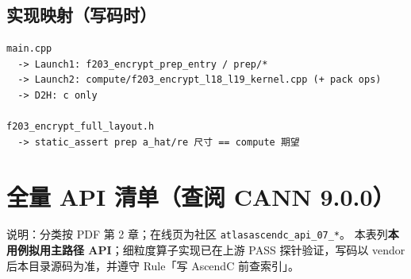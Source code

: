 \documentclass[UTF8,a4paper,11pt]{ctexart}
\begin{document}
\subsection{实现映射（写码时）}

\begin{verbatim}
main.cpp
  -> Launch1: f203_encrypt_prep_entry / prep/*
  -> Launch2: compute/f203_encrypt_l18_l19_kernel.cpp (+ pack ops)
  -> D2H: c only

f203_encrypt_full_layout.h
  -> static_assert prep a_hat/re 尺寸 == compute 期望
\end{verbatim}

\section{全量 API 清单（查阅 CANN 9.0.0）}
\label{sec:api-table}

说明：分类按 PDF 第 2 章；在线页为社区 \texttt{atlasascendc\_api\_07\_*}。
本表列\textbf{本用例拟用主路径 API}；细粒度算子实现已在上游 PASS 探针验证，写码以 vendor 后本目录源码为准，并遵守 Rule「写 AscendC 前查索引」。
\end{document}
